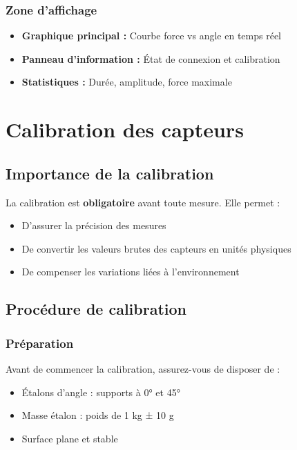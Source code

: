 \documentclass[12pt,a4paper]{article}
\begin{document}
\subsubsection{Zone d'affichage}

\begin{itemize}
    \item \textbf{Graphique principal :} Courbe force vs angle en temps réel
    \item \textbf{Panneau d'information :} État de connexion et calibration
    \item \textbf{Statistiques :} Durée, amplitude, force maximale
\end{itemize}

\section{Calibration des capteurs}

\subsection{Importance de la calibration}

La calibration est \textbf{obligatoire} avant toute mesure. Elle permet :
\begin{itemize}
    \item D'assurer la précision des mesures
    \item De convertir les valeurs brutes des capteurs en unités physiques
    \item De compenser les variations liées à l'environnement
\end{itemize}

\subsection{Procédure de calibration}

\subsubsection{Préparation}

Avant de commencer la calibration, assurez-vous de disposer de :
\begin{itemize}
    \item Étalons d'angle : supports à 0° et 45°
    \item Masse étalon : poids de 1 kg ± 10 g
    \item Surface plane et stable
\end{itemize}
\end{document}
